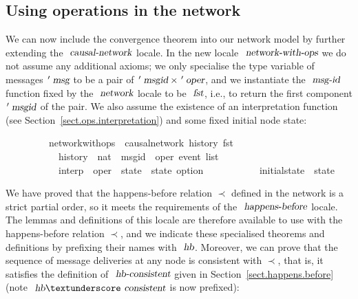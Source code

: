 \vspace{-0.1em}
\subsection{Using operations in the network}\label{sect.network.ops}

We can now include the convergence theorem into our network model by further extending the $\isa{causal-network}$ locale.
In the new locale $\isa{network-with-ops}$ we do not assume any additional axioms; we only specialise the type variable of messages $\isacharprime\isa{msg}$ to be a pair of $\isacharprime\isa{msgid} \mathbin{\isasymtimes} \isacharprime\isa{oper}$, and we instantiate the $\isa{msg-id}$ function fixed by the $\isa{network}$ locale to be $\isa{fst}$, i.e., to return the first component $\isacharprime\isa{msgid}$ of the pair.
We also assume the existence of an interpretation function (see Section~\ref{sect.ops.interpretation}) and some fixed initial node state:
\vspace{0.25em}
\begin{isabellebody}
\ \ \ \ \ \ \ \ \ network{\isacharunderscore}with{\isacharunderscore}ops\ {\isacharequal}\ causal{\isacharunderscore}network\ history\ fst\isanewline
\ \ \ \ \ \ \ \ \ \ \ history\ {\isacharcolon}{\isacharcolon}\ {\isachardoublequoteopen}nat\ {\isasymRightarrow}\ {\isacharparenleft}{\isacharprime}msgid\ {\isasymtimes}\ {\isacharprime}oper{\isacharparenright}\ event\ list{\isachardoublequoteclose}\ {\isacharplus}\isanewline
\ \ \ \ \ \ \ \ \ \ \ interp\ {\isacharcolon}{\isacharcolon}\ {\isachardoublequoteopen}{\isacharprime}oper\ {\isasymRightarrow}\ {\isacharprime}state\ {\isasymRightarrow}\ {\isacharprime}state\ option{\isachardoublequoteclose}\isanewline
\ \ \ \ \ \ \ \ \ \ \ initial{\isacharunderscore}state\ {\isacharcolon}{\isacharcolon}\ {\isachardoublequoteopen}{\isacharprime}state{\isachardoublequoteclose}
\end{isabellebody}
\vspace{0.25em}
We have proved that the happens-before relation $\prec$ defined in the network is a strict partial order, so it meets the requirements of the $\isa{happens-before}$ locale.
The lemmas and definitions of this locale are therefore available to use with the happens-before relation $\prec$, and we indicate these specialised theorems and definitions by prefixing their names with $\isa{hb}$.
Moreover, we can prove that the sequence of message deliveries at any node is consistent with $\prec$, that is, it satisfies the definition of $\isa{hb-consistent}$ given in Section~\ref{sect.happens.before} (note $\isa{hb}{\isacharunderscore}\isa{consistent}$ is now prefixed):
